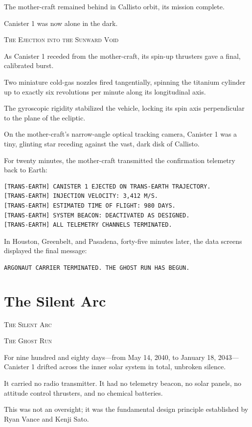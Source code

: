 \documentclass[12pt,twoside,openright]{book}
\newcommand{\sceneheader}[1]{%
  \par\vspace{1.8em}%
  {\noindent\centering\scshape\large #1\par}%
  \vspace{1.0em}%
  \noindent%
}
\newcommand{\dinkus}{%
  \par\vspace{1.2em}%
  {\noindent\centering{\large $\ast\quad\ast\quad\ast$}\par}%
  \vspace{1.2em}%
  \noindent%
}
\begin{document}
The mother-craft remained behind in Callisto orbit, its mission
complete.

Canister 1 was now alone in the dark.

\dinkus

\sceneheader{The Ejection into the Sunward
Void}

As Canister 1 receded from the mother-craft, its spin-up thrusters gave
a final, calibrated burst.

Two miniature cold-gas nozzles fired tangentially, spinning the titanium
cylinder up to exactly six revolutions per minute along its longitudinal
axis.

The gyroscopic rigidity stabilized the vehicle, locking its spin axis
perpendicular to the plane of the ecliptic.

On the mother-craft's narrow-angle optical tracking camera, Canister 1
was a tiny, glinting star receding against the vast, dark disk of
Callisto.

For twenty minutes, the mother-craft transmitted the confirmation
telemetry back to Earth:

\begin{lstlisting}
[TRANS-EARTH] CANISTER 1 EJECTED ON TRANS-EARTH TRAJECTORY.
[TRANS-EARTH] INJECTION VELOCITY: 3,412 M/S.
[TRANS-EARTH] ESTIMATED TIME OF FLIGHT: 980 DAYS.
[TRANS-EARTH] SYSTEM BEACON: DEACTIVATED AS DESIGNED.
[TRANS-EARTH] ALL TELEMETRY CHANNELS TERMINATED.
\end{lstlisting}

In Houston, Greenbelt, and Pasadena, forty-five minutes later, the data
screens displayed the final message:

\passthrough{\lstinline!ARGONAUT CARRIER TERMINATED. THE GHOST RUN HAS BEGUN.!}

\chapter{The Silent Arc}
\sceneheader{The Silent Arc}

\sceneheader{The Ghost Run}

For nine hundred and eighty days---from May 14, 2040, to January 18,
2043---Canister 1 drifted across the inner solar system in total,
unbroken silence.

It carried no radio transmitter. It had no telemetry beacon, no solar
panels, no attitude control thrusters, and no chemical batteries.

This was not an oversight; it was the fundamental design principle
established by Ryan Vance and Kenji Sato.
\end{document}
